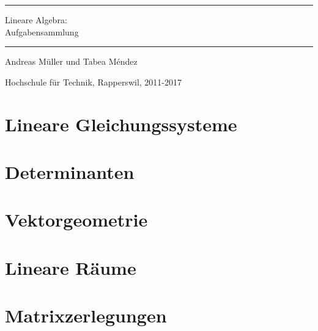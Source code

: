 \documentclass[a4paper,12pt]{book}
\begin{document}
\pagestyle{fancy}
\rhead{}
\frontmatter
\newcommand\HRule{\noindent\rule{\linewidth}{1.5pt}}
\begin{titlepage}
\HRule
\vspace*{2pt}
\begin{flushright}
{\Huge
Lineare Algebra:\\
\bigskip
Aufgabensammlung}
\end{flushright}
\HRule
\begin{flushright}
\vspace{30pt}
\LARGE
Andreas Müller
und
Tabea Méndez
\end{flushright}
\begin{center}
Hochschule für Technik, Rapperswil, 2011-2017
\end{center}
\end{titlepage}
\tableofcontents
\newenvironment{beispiel}[1][Beispiel]{%
\begin{proof}[#1]%
\renewcommand{\qedsymbol}{$\bigcirc$}
}{\end{proof}}
\mainmatter


\openthemaindex
{}
\allowdisplaybreaks
\chapter{Lineare Gleichungssysteme}

\chapter{Determinanten}

\chapter{Vektorgeometrie}

\chapter{Lineare Räume}

\chapter{Matrixzerlegungen}

\end{document}
